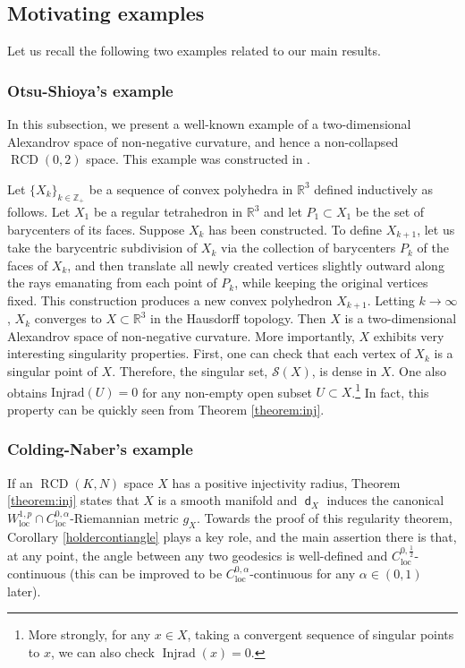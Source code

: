 \documentclass[11pt,reqno]{amsart}
\theoremstyle{definition}
\numberwithin{equation}{section}
\newcommand{\dR}{\mathbb{R}}
\newcommand{\dZ}{\mathbb{Z}}
\DeclareMathOperator{\dist}{\mathsf{d}}
\DeclareMathOperator{\Injrad}{Injrad}
\DeclareMathOperator{\loc}{loc}
\DeclareMathOperator{\RCD}{RCD}
\begin{document}
\subsection{Motivating examples}\label{secexample}
Let us recall the following two examples related to our main results.
\subsubsection{Otsu-Shioya's example}\label{subsec inj}


In this subsection, we present a well-known example of a two-dimensional Alexandrov space of non-negative curvature, and hence a non-collapsed $\RCD(0,2)$ space. This example was constructed in \cite{OS}.



Let $\{X_k\}_{k\in\dZ_+}$ be a sequence of convex polyhedra in $\dR^3$ defined inductively as follows. Let $X_1$ be a regular tetrahedron in $\mathbb{R}^3$ and let $P_1 \subset X_1$ be the set of barycenters of its faces. Suppose $X_k$ has been constructed. To define $X_{k+1}$, let us take the barycentric subdivision of $X_k$ via the collection of barycenters $P_k$ of the faces of $X_k$, and then translate all newly created vertices slightly outward along the rays emanating from each point of $P_k$, while keeping the original vertices fixed. This construction produces a new convex polyhedron $X_{k+1}$.
Letting $k\to \infty$,  $X_k$ converges to $X \subset \mathbb{R}^3$ in the Hausdorff topology.  Then $X$ is a two-dimensional Alexandrov space of non-negative curvature.  
More importantly, $X$ exhibits very interesting singularity properties. First, one can check that each vertex of $X_k$ is a singular point of $X$. Therefore, the singular set, $\mathcal{S}(X)$, is dense in $X$.
One also obtains $\mathrm{Injrad}(U)=0$ for any non-empty open subset $U\subset X$.\footnote{More strongly, for any $x \in X$, taking a convergent sequence of singular points to $x$, we can also check $\Injrad(x)=0$.}  In fact, this property can be quickly seen from Theorem \ref{theorem:inj}. 


\subsubsection{Colding-Naber's example}



If an $\RCD(K, N)$ space $X$
has a positive injectivity radius,  Theorem \ref{theorem:inj} states that $X$ is a smooth manifold and $\dist_X$ induces the canonical $W^{1,p}_{\loc}\cap C^{0,\alpha}_{\loc}$-Riemannian metric $g_X$. Towards the proof of this regularity theorem,  Corollary \ref{holdercontiangle} plays a key role, and the main assertion there is that, at any point, the angle between any two geodesics is well-defined and $C^{0,\frac{1}{2}}_{\loc}$-continuous (this can be improved to be $C^{0,\alpha}_{\loc}$-continuous for any $\alpha \in (0,1)$ later).
\end{document}
